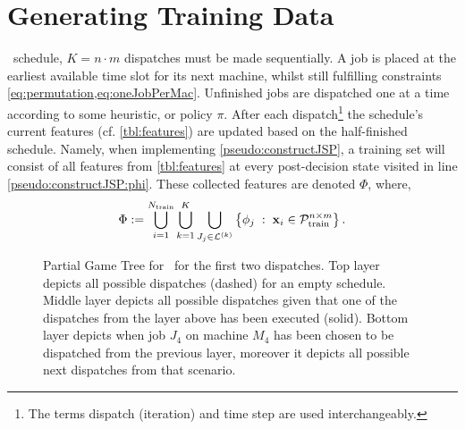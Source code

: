 
\chapter{Generating Training Data}\label{ch:gentrdat} 

 \jsp\ schedule, $K=n\cdot m$ 
dispatches must be made sequentially.
A job is placed at the earliest available time slot for its next machine, 
whilst still fulfilling constraints \cref{eq:permutation,eq:oneJobPerMac}.
Unfinished jobs are dispatched one at a time according to some heuristic, or 
policy $\pi$. 
After each dispatch\footnote{The terms dispatch (iteration) and time step are 
    used interchangeably.} the schedule's current features (cf. 
\cref{tbl:features}) are updated based on the half-finished schedule. Namely, 
when implementing \cref{pseudo:constructJSP}, a training set will consist of 
all features from \cref{tbl:features} at every post-decision state visited in 
line \ref{pseudo:constructJSP:phi}. 
These collected features are denoted $\Phi$, where, 
\begin{equation}\label{eq:Phi}
\Phi:= \bigcup_{i=1}^{N_{\train}} 
\bigcup_{k=1}^K\bigcup_{J_j\in\mathcal{L}^{(k)}} 
\condset{\vphi_j}{\vec{x}_i\in\mathcal{P}^{n\times m}_{\train} }.
\end{equation}

\begin{figure}[p]
    
    \vspace{-27pt}
    \caption[Partial Game Tree for \jsp]{Partial Game Tree for \jsp\ for the 
        first two dispatches. 
        Top layer depicts all possible dispatches (dashed) for an empty 
        schedule. 
        Middle layer depicts all possible dispatches given that one of the 
        dispatches from the layer above has been executed (solid). 
        Bottom layer depicts when job $J_4$ on machine $M_4$ has been chosen to 
        be dispatched from the previous layer, moreover it depicts all possible 
        next dispatches from that scenario.}
    \label{fig:example:gametree}
\end{figure}

\vspace*{-24pt}
